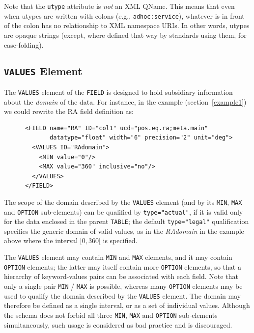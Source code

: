 \documentclass[11pt,a4paper]{ivoa}
\def\Aref#1{section~\ref{#1}}
\let\fg=\color
\def\attr#1{{\tt{\fg{DarkRed}#1}}}
\def\elem#1{{\tt{\fg{DarkRed}#1}}}
\def\attrval#1#2{{\tt{\fg{DarkRed}#1}="{\fg{DarkPurple}#2}"}}
\begin{document}
Note that the \attr{utype} attribute is \emph{not} an XML QName.  This
means that even when utypes are written with colons (e.g.,
\texttt{adhoc:service}), whatever is in front of the colon has no
relationship to XML namespace URIs.  In other words, utypes are opaque
strings (except, where defined that way by standards using them, for
case-folding).

\subsection{\elem{VALUES} Element}
\label{sec:values}

The {\elem{VALUES}} element of the {\elem{FIELD}}
is designed to hold subsidiary information about the {\em domain} of the
data. For instance, in the example (\Aref{example1})
we could rewrite the RA field definition as:

\begingroup\small
\begin{verbatim}
      <FIELD name="RA" ID="col1" ucd="pos.eq.ra;meta.main"
             datatype="float" width="6" precision="2" unit="deg">
        <VALUES ID="RAdomain">
          <MIN value="0"/>
          <MAX value="360" inclusive="no"/>
        </VALUES>
      </FIELD>
\end{verbatim}
\endgroup

\noindent The scope of the domain described by the \elem{VALUES} element
(and by its \elem{MIN}, \elem{MAX} and \elem{OPTION} sub-elements)
can be qualified by \attrval{type}{actual}, if it is valid only for
the data enclosed in the parent \elem{TABLE}; the default \attrval{type}{legal}
qualification specifies the generic domain of valid values, as in the
{\em RAdomain} in the example above where the interval $[0,360[$ is specified.

\label{elem:VALUES}
\label{elem:MIN}
\label{elem:MAX}
\label{elem:OPTION}
The \elem{VALUES} element may contain {\elem{MIN}} and {\elem{MAX}} elements,
and it may contain {\elem{OPTION}} elements;
the latter may itself contain more {\elem{OPTION}}
elements, so that a hierarchy of keyword-values pairs can be
associated with each field.
Note that only a single pair \elem{MIN} / \elem{MAX} is possible,
whereas many \elem{OPTION} elements may be used to qualify the domain
described by the \elem{VALUES} element.
The domain may therefore be defined as a single interval, or as a set
of individual values. Although the schema does not forbid all three
\elem{MIN}, \elem{MAX} and \elem{OPTION} sub-elements simultaneously,
such usage is considered as bad practice and is discouraged.
\end{document}
